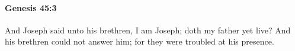 
		\paragraph{Genesis 45:3} %
			\label{GENESIS-45-3}

			And Joseph said unto his brethren, I am Joseph; doth my father yet live? And his brethren could not answer him; for they were troubled at his presence.


